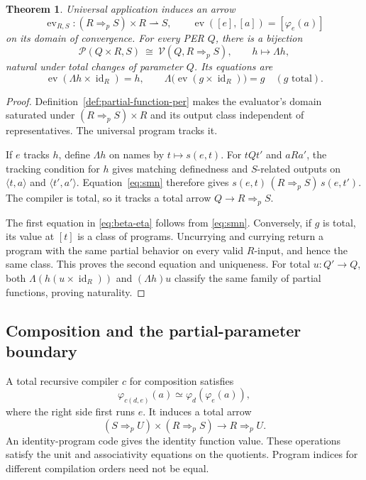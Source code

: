 \documentclass[11pt]{article}
\newtheorem{theorem}{Theorem}[section]
\theoremstyle{definition}
\newcommand{\Pcat}{\mathcal P}
\newcommand{\Vcat}{\mathcal V}
\newcommand{\id}{\operatorname{id}}
\newcommand{\ev}{\operatorname{ev}}
\newcommand{\pArr}{\mathbin{\Rightarrow_{\!p}}}
\begin{document}
\begin{theorem}\label{thm:partial-currying}
Universal application induces an arrow
\[
 \ev_{R,S}:(R\pArr S)\times R\rightharpoonup S,
 \qquad \ev([e],[a])=[\varphi_e(a)]
\]
on its domain of convergence. For every PER $Q$, there is a bijection
\begin{equation}\label{eq:currying}
 \Pcat(Q\times R,S)\ \cong\ \Vcat(Q,R\pArr S),
 \qquad h\longmapsto\Lambda h,
\end{equation}
natural under total changes of parameter $Q$. Its equations are
\begin{equation}\label{eq:beta-eta}
 \ev(\Lambda h\times\id_R)=h,
 \qquad \Lambda\bigl(\ev(g\times\id_R)\bigr)=g
       \quad(g\text{ total}).
\end{equation}
\end{theorem}
\begin{proof}
Definition~\ref{def:partial-function-per} makes the evaluator's
domain saturated under $(R\pArr S)\times R$ and its output class
independent of representatives. The universal program tracks it.

If $e$ tracks $h$, define $\Lambda h$ on names by
$t\mapsto s(e,t)$. For $tQt'$ and $aRa'$, the tracking condition
for $h$ gives matching definedness and $S$-related outputs on
$\langle t,a\rangle$ and $\langle t',a'\rangle$.
Equation~\eqref{eq:smn} therefore gives
$s(e,t)\,(R\pArr S)\,s(e,t')$. The compiler is total, so it
tracks a total arrow $Q\to R\pArr S$.

The first equation in \eqref{eq:beta-eta} follows from
\eqref{eq:smn}. Conversely, if $g$ is total, its value at $[t]$
is a class of programs. Uncurrying and currying return a program
with the same partial behavior on every valid $R$-input, and hence
the same class. This proves the second equation and uniqueness.
For total $u:Q'\to Q$, both $\Lambda(h(u\times\id_R))$
and $(\Lambda h)u$ classify the same family of partial functions,
proving naturality.
\end{proof}

\subsection{Composition and the partial-parameter boundary}

A total recursive compiler $c$ for composition satisfies
\[
 \varphi_{c(d,e)}(a)\simeq\varphi_d(\varphi_e(a)),
\]
where the right side first runs $e$. It induces a total arrow
\[
 (S\pArr U)\times(R\pArr S)\longrightarrow R\pArr U.
\]
An identity-program code gives the identity function value. These
operations satisfy the unit and associativity equations on the
quotients. Program indices for different compilation orders need not
be equal.
\end{document}

